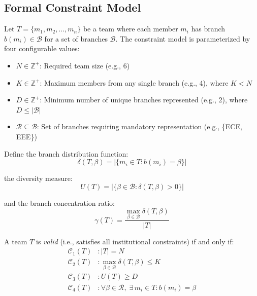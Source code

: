 \documentclass[conference]{IEEEtran}
\begin{document}
\subsection{Formal Constraint Model}

Let $T = \{m_1, m_2, \ldots, m_n\}$ be a team where each member $m_i$ has branch $b(m_i) \in \mathcal{B}$ for a set of branches $\mathcal{B}$. The constraint model is parameterized by four configurable values:

\begin{itemize}[noitemsep,topsep=3pt]
    \item $N \in \mathbb{Z}^+$: Required team size (e.g., 6)
    \item $K \in \mathbb{Z}^+$: Maximum members from any single branch (e.g., 4), where $K < N$
    \item $D \in \mathbb{Z}^+$: Minimum number of unique branches represented (e.g., 2), where $D \leq |\mathcal{B}|$
    \item $\mathcal{R} \subseteq \mathcal{B}$: Set of branches requiring mandatory representation (e.g., \{ECE, EEE\})
\end{itemize}

Define the branch distribution function:
\begin{equation}
    \delta(T, \beta) = |\{m_i \in T : b(m_i) = \beta\}|
\end{equation}

the diversity measure:
\begin{equation}
    U(T) = |\{\beta \in \mathcal{B} : \delta(T, \beta) > 0\}|
\end{equation}

and the branch concentration ratio:
\begin{equation}
    \gamma(T) = \frac{\max_{\beta \in \mathcal{B}} \delta(T, \beta)}{|T|}
\end{equation}

A team $T$ is \textit{valid} (i.e., satisfies all institutional constraints) if and only if:
\begin{align}
    \mathcal{C}_1(T) &: |T| = N \label{eq:c1} \\
    \mathcal{C}_2(T) &: \max_{\beta \in \mathcal{B}} \delta(T, \beta) \leq K \label{eq:c2} \\
    \mathcal{C}_3(T) &: U(T) \geq D \label{eq:c3} \\
    \mathcal{C}_4(T) &: \forall \beta \in \mathcal{R},\; \exists\, m_i \in T : b(m_i) = \beta \label{eq:c4}
\end{align}
\end{document}
